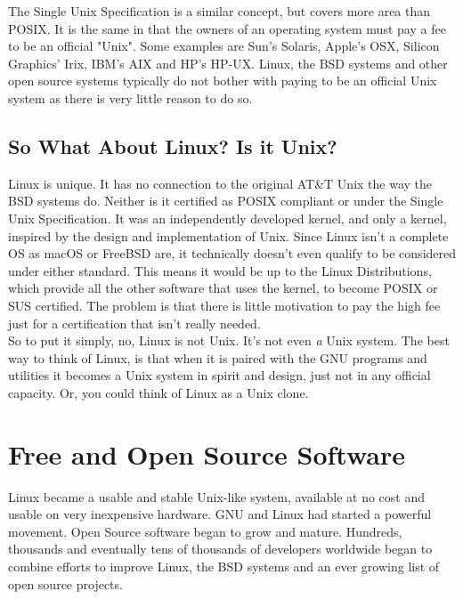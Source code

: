 The Single Unix Specification is a similar concept, but covers more area than POSIX.  It is the same in that the owners of an operating system must pay a fee to be an official "Unix".  Some examples are Sun's Solaris, Apple's OSX, Silicon Graphics' Irix, IBM's AIX and HP's HP-UX.  Linux, the BSD systems and other open source systems typically do not bother with paying to be an official Unix system as there is very little reason to do so.\\

\subsection{So What About Linux? Is it Unix?}

Linux is unique.  It has no connection to the original AT\&T Unix the way the BSD systems do.  Neither is it certified as POSIX compliant or under the Single Unix Specification.  It was an independently developed kernel, and only a kernel, inspired by the design and implementation of Unix.  Since Linux isn't a complete OS as macOS or FreeBSD are, it technically doesn't even qualify to be considered under either standard.  This means it would be up to the Linux Distributions, which provide all the other software that uses the kernel, to become POSIX or SUS certified.  The problem is that there is little motivation to pay the high fee just for a certification that isn't really needed.\\

So to put it simply, no, Linux is not Unix.  It's not even \textit{a} Unix system.  The best way to think of Linux, is that when it is paired with the GNU programs and utilities it becomes a Unix system in spirit and design, just not in any official capacity.  Or, you could think of Linux as a Unix clone.

\section{Free and Open Source Software}

Linux became a usable and stable Unix-like system, available at no cost and usable on very inexpensive hardware. GNU and Linux had started a powerful movement.  Open Source software began to grow and mature.  Hundreds, thousands and eventually tens of thousands of developers worldwide began to combine efforts to improve Linux, the BSD systems and an ever growing list of open source projects.\\

